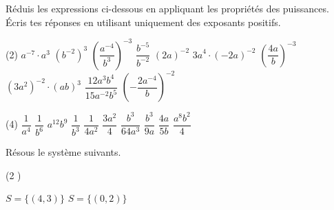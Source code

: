 \documentclass[a4paper, 12pt, parskip=half-, twoside=semi]{scrartcl}
\begin{document}
\begin{appliquer}[points=10]
    Réduis les expressions ci-dessous en appliquant les propriétés des puissances.
    Écris tes réponses en utilisant uniquement des exposants positifs.
    \begin{tasks}(2)
        \task \(a^{- 7} \cdot a^{3}\)
        \task \(\left( b^{- 2} \right)^{3}\)
        \task \(\left( \dfrac{a^{- 4}}{b^{3}} \right)^{- 3}\)
        \task \(\dfrac{b^{- 5}}{b^{- 2}}\)
        \task \({(2a)}^{- 2}\)
        \task \({3a}^{4} \cdot ( - 2a)^{- 2}\)
        \task \(\left( \dfrac{4a}{b} \right)^{- 3}\)
        \task \(\left( 3a^{2} \right)^{- 2} \cdot (ab)^{3}\)
        \task \(\dfrac{12a^{3}b^{4}}{15a^{- 2}b^{5}}\)
        \task \(\left( - \dfrac{2a^{- 4}}{b} \right)^{- 2}\)
    \end{tasks}
\end{appliquer}
\begin{solappliquer}
    \begin{tasks}(4)
        \task \(\dfrac{1}{a^4}\)
        \task \(\dfrac{1}{b^6}\)
        \task \(a^{12}b^{9}\)
        \task \(\dfrac{1}{b^3}\)
        \task \(\dfrac{1}{4a^2}\)
        \task \(\dfrac{3a^2}{4}\)
        \task \(\dfrac{b^3}{64a^3}\)
        \task \(\dfrac{b^3}{9a}\)
        \task \(\dfrac{4a}{5b}\)
        \task \(\dfrac{a^8b^2}{4}\)
    \end{tasks}
\end{solappliquer}
\begin{appliquer}[points=4]
    Résous le système suivants.
    \begin{tasks}(2 )
        \task {}
        \task {}
    \end{tasks}
\end{appliquer}
\begin{solappliquer}
    \begin{tasks}
        \task \(S = \big\{ \left(4,3\right)\big\}\)
        \task \(S = \big\{ \left(0,2\right)\big\}\)
    \end{tasks}
\end{solappliquer}
\end{document}
